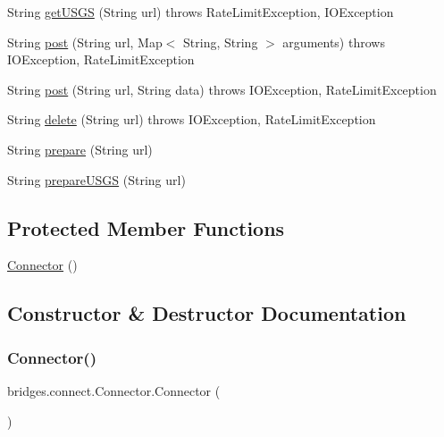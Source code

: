 \begin{DoxyCompactItemize}
\item 
String \mbox{\hyperlink{classbridges_1_1connect_1_1_connector_a1781405c9b38c338bce042bf7ff23eaf}{get\+U\+S\+GS}} (String url)  throws Rate\+Limit\+Exception, I\+O\+Exception 
\item 
String \mbox{\hyperlink{classbridges_1_1connect_1_1_connector_a88e465aed707d59b96958dcc946ff6b4}{post}} (String url, Map$<$ String, String $>$ arguments)  throws I\+O\+Exception, Rate\+Limit\+Exception 
\item 
String \mbox{\hyperlink{classbridges_1_1connect_1_1_connector_a4b8978743a8c230b86500f5a00cb2697}{post}} (String url, String data)  throws I\+O\+Exception, 		\+Rate\+Limit\+Exception 
\item 
String \mbox{\hyperlink{classbridges_1_1connect_1_1_connector_ac0a6f796f1ebcf312b89a7d233c8ac91}{delete}} (String url)  throws I\+O\+Exception, Rate\+Limit\+Exception 
\item 
String \mbox{\hyperlink{classbridges_1_1connect_1_1_connector_a507ee5a9d8c812ffd4629cbd22f27373}{prepare}} (String url)
\item 
String \mbox{\hyperlink{classbridges_1_1connect_1_1_connector_aa0201e2569358ff906d3c14d654711e5}{prepare\+U\+S\+GS}} (String url)
\end{DoxyCompactItemize}
\subsection*{Protected Member Functions}
\begin{DoxyCompactItemize}
\item 
\mbox{\hyperlink{classbridges_1_1connect_1_1_connector_a167800699b2d191bd625d9c8c8cd9e6f}{Connector}} ()
\end{DoxyCompactItemize}


\subsection{Constructor \& Destructor Documentation}
\mbox{\label{classbridges_1_1connect_1_1_connector_a167800699b2d191bd625d9c8c8cd9e6f}} 
\subsubsection{\texorpdfstring{Connector()}{Connector()}}
{\footnotesize\ttfamily bridges.\+connect.\+Connector.\+Connector (\begin{DoxyParamCaption}{ }\end{DoxyParamCaption})\hspace{0.3cm}{\ttfamily [protected]}}



